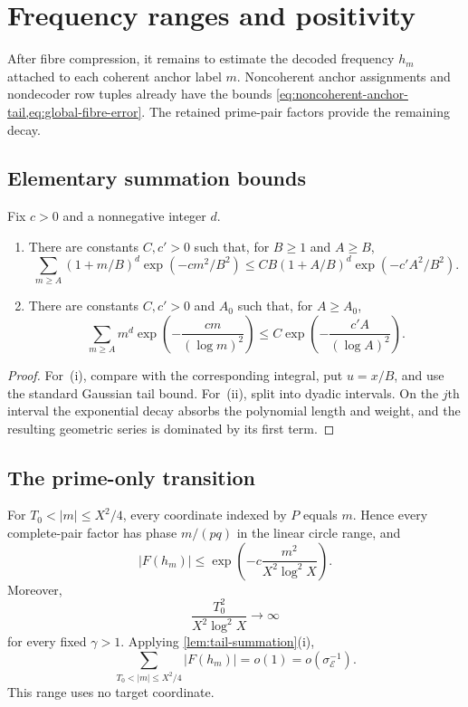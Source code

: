 \section{Frequency ranges and positivity}
\label{sec:frequency-positivity}

After fibre compression, it remains to estimate the decoded frequency $h_m$ attached to each coherent anchor label $m$. Noncoherent anchor assignments and nondecoder row tuples already have the bounds \cref{eq:noncoherent-anchor-tail,eq:global-fibre-error}. The retained prime-pair factors provide the remaining decay.

\subsection{Elementary summation bounds}

\begin{lemma}
\label{lem:tail-summation}
Fix $c>0$ and a nonnegative integer $d$.
\begin{enumerate}[label=(\roman*)]
\item There are constants $C,c'>0$ such that, for $B\geq1$ and $A\geq B$,
\[
 \sum_{m\geq A}(1+m/B)^d\exp(-cm^2/B^2)
 \leq CB(1+A/B)^d\exp(-c'A^2/B^2).
\]
\item There are constants $C,c'>0$ and $A_0$ such that, for $A\geq A_0$,
\[
 \sum_{m\geq A}m^d\exp\left(-\frac{cm}{(\log m)^2}\right)
 \leq C\exp\left(-\frac{c'A}{(\log A)^2}\right).
\]
\end{enumerate}
\end{lemma}
\begin{proof}
For~(i), compare with the corresponding integral, put $u=x/B$, and use the standard Gaussian tail bound. For~(ii), split into dyadic intervals. On the $j$th interval the exponential decay absorbs the polynomial length and weight, and the resulting geometric series is dominated by its first term.
\end{proof}

\subsection{The prime-only transition}

For $T_0<|m|\leq X^2/4$, every coordinate indexed by $P$ equals $m$. Hence every complete-pair factor has phase $m/(pq)$ in the linear circle range, and
\begin{equation}
\label{eq:transition-pointwise}
 |F(h_m)|\leq\exp\left(-c\frac{m^2}{X^2\log^2X}\right).
\end{equation}
Moreover,
\[
 \frac{T_0^2}{X^2\log^2X}\longrightarrow\infty
\]
for every fixed $\gamma>1$. Applying \cref{lem:tail-summation}(i),
\begin{equation}
\label{eq:transition-total}
 \sum_{T_0<|m|\leq X^2/4}|F(h_m)|=o(1)=o(\sigma_{\mathcal E}^{-1}).
\end{equation}
This range uses no target coordinate.

